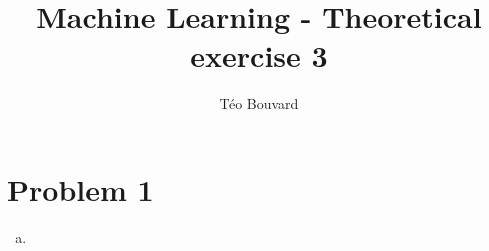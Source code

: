 \documentclass[a4paper, 10pt, twoside]{article}
\begin{document}
\title{Machine Learning - Theoretical exercise 3}
\author{T\'eo Bouvard}
\maketitle

\section*{Problem 1}
\begin{enumerate}[a)]
    \item 
\end{enumerate}
\end{document}
